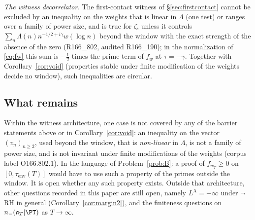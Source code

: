 \emph{The witness decorrelator.} The first-contact witness of \S\ref{sec:firstcontact} cannot be excluded by an
inequality on the weights that is linear in $\Lambda$ (one test) or ranges over a family of power size, and is
true for $\zeta$, unless it controls $\sum_n\Lambda(n)n^{-1/2+i\gamma}w(\log n)$ beyond the window with the exact
strength of the absence of the zero (R166\_802, audited R166\_190); in the normalization of \eqref{eq:fw} this sum is
$-\frac12$ times the prime term of $f_w$ at $\tau=-\gamma$. Together with Corollary~\ref{cor:void} (properties
stable under finite modification of the weights decide no window), such inequalities are circular.

\subsection{What remains}
Within the witness architecture, one case is not covered by any of the barrier statements above or in
Corollary~\ref{cor:void}: an inequality on the vector $(v_n)_{n\ge2}$, used beyond the window, that is
\emph{non-linear} in $\Lambda$, is not a family of power size, and is not invariant under finite modifications of
the weights (corpus label O166.802.1). In the language of Problem~\ref{prob:B}: a proof of $f_{w_T}\ge0$ on
$[0,\tau_{\mathrm{env}}(T)]$ would have to use such a property of the primes outside the window. It is open
whether any such property exists. Outside that architecture, other questions recorded in this paper are still
open, namely $L^{\mathrm A}=-\infty$ under $\neg$RH in general (Corollary~\ref{cor:margin2}), and the
finiteness questions on $n_-(\mathfrak a_T|\PT)$ as $T\to\infty$.


